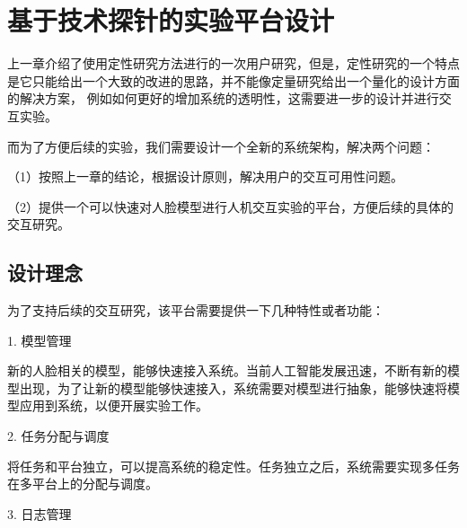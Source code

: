 \chapter{基于技术探针的实验平台设计}

上一章介绍了使用定性研究方法进行的一次用户研究，但是，定性研究的一个特点是它只能给出一个大致的改进的思路，并不能像定量研究给出一个量化的设计方面的解决方案，
例如如何更好的增加系统的透明性，这需要进一步的设计并进行交互实验。

而为了方便后续的实验，我们需要设计一个全新的系统架构，解决两个问题：

（1）按照上一章的结论，根据设计原则，解决用户的交互可用性问题。

（2）提供一个可以快速对人脸模型进行人机交互实验的平台，方便后续的具体的交互研究。








\section{设计理念}



为了支持后续的交互研究，该平台需要提供一下几种特性或者功能：

1. 模型管理

新的人脸相关的模型，能够快速接入系统。当前人工智能发展迅速，不断有新的模型出现，为了让新的模型能够快速接入，系统需要对模型进行抽象，能够快速将模型应用到系统，以便开展实验工作。

2. 任务分配与调度

将任务和平台独立，可以提高系统的稳定性。任务独立之后，系统需要实现多任务在多平台上的分配与调度。

3. 日志管理

